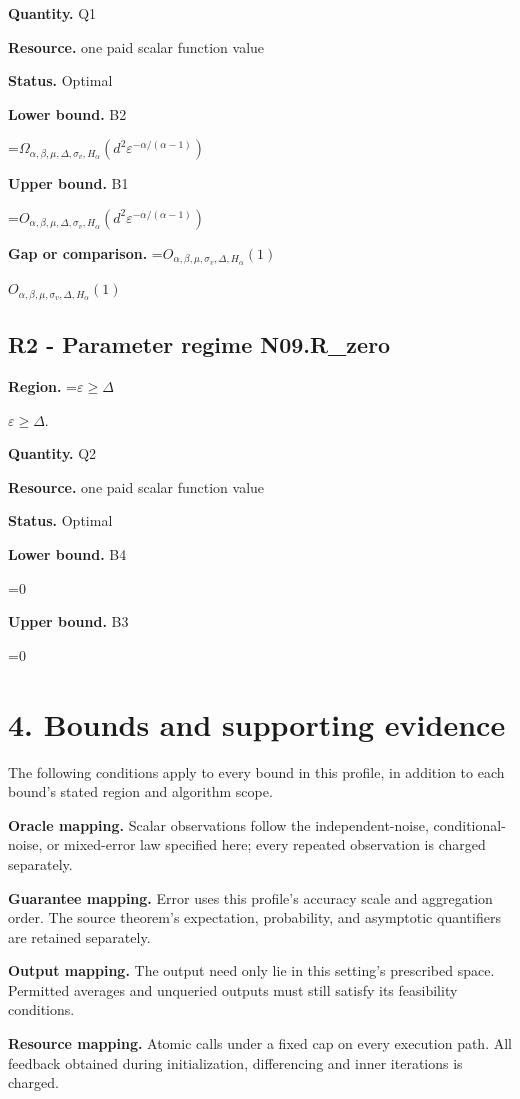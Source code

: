 \documentclass[10pt,a4paper]{article}
\newcommand{\AtlasMath}[1]{\par\begingroup\centering\setbox0=\hbox{$\displaystyle #1$}\ifdim\wd0>1.4\linewidth\typeout{ATLAS WIDE FORMULA: \the\wd0}\fi\ifdim\wd0>\linewidth\resizebox{\linewidth}{!}{\box0}\else\box0\fi\par\endgroup}
\newcommand{\AtlasInlineMath}[1]{\begingroup\setbox0=\hbox{$#1$}\ifdim\wd0>.4\linewidth\endgroup\AtlasMath{#1}\else\endgroup$#1$\fi}
\begin{document}
\textbf{Quantity.} Q1

\textbf{Resource.} one paid scalar function value

\textbf{Status.} Optimal

\textbf{Lower bound.} B2

\AtlasMath{\Omega_{\alpha,\beta,\mu,\Delta,\sigma_v,H_\alpha}(d^2\varepsilon^{-\alpha/(\alpha-1)})}
\textbf{Upper bound.} B1

\AtlasMath{O_{\alpha,\beta,\mu,\Delta,\sigma_v,H_\alpha}(d^2\varepsilon^{-\alpha/(\alpha-1)})}
\textbf{Gap or comparison.} \AtlasInlineMath{O_{\alpha,\beta,\mu,\sigma_v,\Delta,H_\alpha}(1)}

\subsection{R2 - Parameter regime N09.R\_zero}
\textbf{Region.} \AtlasInlineMath{\varepsilon\ge\Delta}.

\textbf{Quantity.} Q2

\textbf{Resource.} one paid scalar function value

\textbf{Status.} Optimal

\textbf{Lower bound.} B4

\AtlasMath{0}
\textbf{Upper bound.} B3

\AtlasMath{0}
\section{4. Bounds and supporting evidence}
The following conditions apply to every bound in this profile, in addition to each bound's stated region and algorithm scope.

\textbf{Oracle mapping.} Scalar observations follow the independent-noise, conditional-noise, or mixed-error law specified here; every repeated observation is charged separately.

\textbf{Guarantee mapping.} Error uses this profile's accuracy scale and aggregation order. The source theorem's expectation, probability, and asymptotic quantifiers are retained separately.

\textbf{Output mapping.} The output need only lie in this setting's prescribed space. Permitted averages and unqueried outputs must still satisfy its feasibility conditions.

\textbf{Resource mapping.} Atomic calls under a fixed cap on every execution path. All feedback obtained during initialization, differencing and inner iterations is charged.
\end{document}
